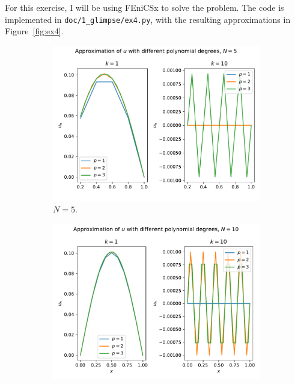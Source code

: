 \begin{solution}
    For this exercise, I will be using FEniCSx to solve the problem.
    The code is implemented in \verb|doc/1_glimpse/ex4.py|, with the resulting approximations in Figure~\ref{fig:ex4}.
    \begin{figure}
        \centering
        \begin{subfigure}[b]{0.45\textwidth}
            \includegraphics[width=\textwidth]{1_glimpse/exercise_1_4_N=5.pdf}
            \caption{$N=5$.\label{fig:ex4_1}}
        \end{subfigure}
        \hfill
        \begin{subfigure}[b]{0.45\textwidth}
            \includegraphics[width=\textwidth]{1_glimpse/exercise_1_4_N=10.pdf}

\end{subfigure}
\end{figure}
\end{solution}
